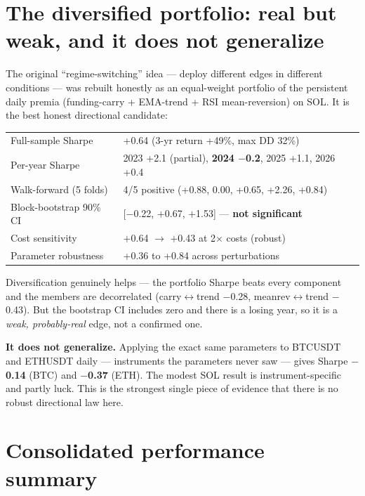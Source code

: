 \documentclass[11pt,a4paper]{article}
\newcommand{\dn}[1]{{\color{crit}\textbf{#1}}}
\begin{document}
\section{The diversified portfolio: real but weak, and it does not generalize}

The original ``regime-switching'' idea --- deploy different edges in different conditions --- was rebuilt honestly as an equal-weight portfolio of the persistent daily premia (funding-carry + EMA-trend + RSI mean-reversion) on SOL. It is the best honest directional candidate:

\begin{center}
\begin{tabular}{ll}
\toprule
Full-sample Sharpe & +0.64 (3-yr return +49\%, max DD 32\%) \\
Per-year Sharpe & 2023 +2.1 (partial), \textbf{2024 $-$0.2}, 2025 +1.1, 2026 +0.4 \\
Walk-forward (5 folds) & 4/5 positive (+0.88, 0.00, +0.65, +2.26, +0.84) \\
Block-bootstrap 90\% CI & [$-$0.22, $+$0.67, $+$1.53] --- \textbf{not significant} \\
Cost sensitivity & $+$0.64 $\to$ $+$0.43 at 2$\times$ costs (robust) \\
Parameter robustness & +0.36 to +0.84 across perturbations \\
\bottomrule
\end{tabular}
\end{center}

Diversification genuinely helps --- the portfolio Sharpe beats every component and the members are decorrelated (carry$\leftrightarrow$trend $-$0.28, meanrev$\leftrightarrow$trend $-$0.43). But the bootstrap CI includes zero and there is a losing year, so it is a \emph{weak, probably-real} edge, not a confirmed one.

\textbf{It does not generalize.} Applying the exact same parameters to BTCUSDT and ETHUSDT daily --- instruments the parameters never saw --- gives Sharpe \dn{$-$0.14} (BTC) and \dn{$-$0.37} (ETH). The modest SOL result is instrument-specific and partly luck. This is the strongest single piece of evidence that there is no robust directional law here.

\section*{Consolidated performance summary}
\end{document}
